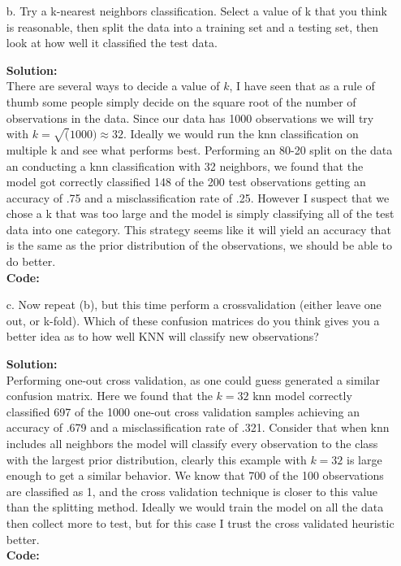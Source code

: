 \documentclass[12pt]{article}
\makeatletter
\theoremstyle{homework}
\newenvironment{exercise}[1]
{\def\@currentlabel{#1}\exercisecore}
{\endexercisecore}
\newcommand{\localhead}[1]{\par\smallskip\noindent\textbf{#1}\nobreak\\}%
\newcommand\solution{\localhead{Solution:}}
\makeatother
\begin{document}
\begin{exercise}{1}
\begin{enumerate}
\begin{figure}[H]
\begin{center}
        \end{center}
      \end{figure}


    \item[b.] Try a k-nearest neighbors classification. Select a value of k that you think is reasonable, then split the data into a training set and a testing set, then look at how well it classified the test data.\\
    \solution There are several ways to decide a value of $k$, I have seen that as a rule of thumb some people simply decide on the square root of the number of observations in the data. Since our data has 1000 observations
    we will try with $k = \sqrt(1000) \approx 32$. Ideally we would run the knn classification on multiple k and see what performs best. Performing an 80-20 split on the data an conducting a knn classification with 32 neighbors, we 
    found that the model got correctly classified 148 of the 200 test observations getting an accuracy of .75 and a misclassification rate of .25. However I suspect that we chose a k that was too large and the model is simply classifying all of the test data 
    into one category. This strategy seems like it will yield an accuracy that is the same as the prior distribution of the observations, we should be able to do better.\\
    \textbf{Code:}
    \begin{center}
    
    \end{center}
    \vspace{.15in}

    \item[c.] Now repeat (b), but this time perform a crossvalidation (either leave one out, or k-fold). Which of these confusion matrices do you think
    gives you a better idea as to how well KNN will classify new observations?\\
    \solution  Performing one-out cross validation, as one could guess generated a similar confusion matrix. Here we found that the $k = 32$ knn model correctly classified 697 of the 1000 one-out cross validation samples achieving an
    accuracy of .679 and a misclassification rate of .321. Consider that when knn includes all neighbors the model will classify every observation to the class with the largest prior distribution, clearly this example with $k = 32$ is large enough 
    to get a similar behavior. We know that 700 of the 100 observations are classified as 1, and the cross validation technique is closer to this value than the splitting method.  Ideally we would train the model on all the data then collect more to test, 
    but for this case I trust the cross validated heuristic better.\\
    \textbf{Code:}
    \begin{center}
    
    \end{center}
    \vspace{.15in}


\end{enumerate}
\end{exercise}
\end{document}
